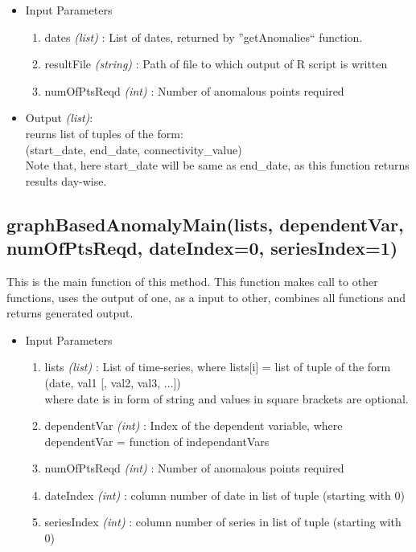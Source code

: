 \begin{itemize}
 \item Input Parameters
 
 \begin{enumerate}
  \item dates \textit{(list)} : List of dates, returned by ''getAnomalies`` 
function.
  \item resultFile \textit{(string)} : Path of file to which output of R script 
is written
  \item numOfPtsReqd \textit{(int)} : Number of anomalous points required

 \end{enumerate}

 \item Output \textit{(list)}: \\
  reurns list of tuples of the form: \\
  (start\_date, end\_date, connectivity\_value) \\
  Note that, here start\_date will be same as end\_date, as this function 
returns results day-wise.
  
\end{itemize}

\subsection{graphBasedAnomalyMain(lists, dependentVar, numOfPtsReqd, 
dateIndex=0, seriesIndex=1)}

This is the main function of this method. This function makes call to other 
functions, uses the output of one, as a input to other, combines all functions 
and returns generated output.

\begin{itemize}
 \item Input Parameters
 
 \begin{enumerate}
  \item lists \textit{(list)} : List of time-series, where lists[i] = list of 
tuple of the form (date, val1 [, val2, val3, ...]) \\
    where date is in form of string and values in square brackets are optional. 
   
  \item dependentVar \textit{(int)} : Index of the dependent variable, where 
dependentVar = function of independantVars
  \item numOfPtsReqd \textit{(int)} : Number of anomalous points required
  \item dateIndex \textit{(int)} : column number of date in list of tuple 
(starting with 0)
  \item seriesIndex \textit{(int)} : column number of series in list of tuple 
(starting with 0)
  
 \end{enumerate}

\end{itemize}

